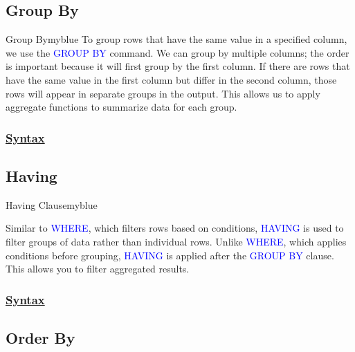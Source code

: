 \subsection{Group By} 
\begin{prettyBox}{Group By}{myblue}
To group rows that have the same value in a specified column, we use the \textcolor{blue}{GROUP BY} command.
We can group by multiple columns; the order is important because it will first group by the first column. If there
are rows that have the same value in the first column but differ in the second column, those rows will appear in
separate groups in the output. This allows us to apply aggregate functions to summarize data for each group.
\end{prettyBox}

\vspace{0.25cm}
\subsubsection*{\underline{Syntax}}




\subsection{Having}
\begin{prettyBox}{Having Clause}{myblue}

    Similar to \textcolor{blue}{WHERE}, which filters rows based on conditions, 
\textcolor{blue}{HAVING} is used to filter groups of data rather than individual rows. Unlike
\textcolor{blue}{WHERE}, which applies conditions before grouping, \textcolor{blue}{HAVING} is
applied after the \textcolor{blue}{GROUP BY} clause. This allows you to filter aggregated results.
\end{prettyBox}


\vspace{0.25cm}
\subsubsection*{\underline{Syntax}}




\vspace{0.5cm}
\subsection{Order By}

